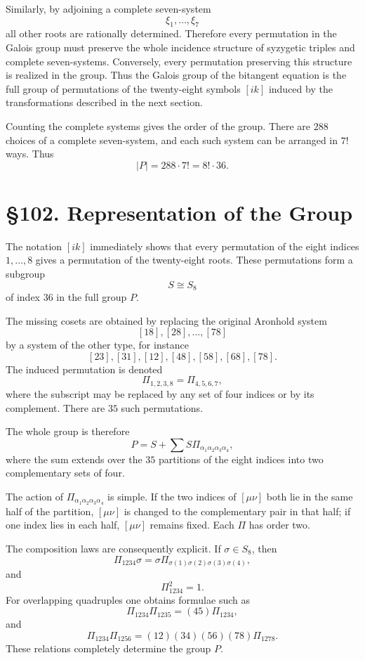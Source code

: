 \documentclass[12pt,a4paper]{article}
\newcommand{\webersection}[2]{\section*{\S #1. #2}\addcontentsline{toc}{section}{\S #1. #2}}
\begin{document}
Similarly, by adjoining a complete seven-system
\[
\xi_1,\ldots,\xi_7
\]
all other roots are rationally determined.  Therefore every permutation in the Galois group must preserve the whole incidence structure of syzygetic triples and complete seven-systems.  Conversely, every permutation preserving this structure is realized in the group.  Thus the Galois group of the bitangent equation is the full group of permutations of the twenty-eight symbols \([ik]\) induced by the transformations described in the next section.

Counting the complete systems gives the order of the group.  There are \(288\) choices of a complete seven-system, and each such system can be arranged in \(7!\) ways.  Thus
\[
|P|=288\cdot7!
   =8!\cdot36.
\]

\webersection{102}{Representation of the Group}

The notation \([ik]\) immediately shows that every permutation of the eight indices \(1,\dots,8\) gives a permutation of the twenty-eight roots.  These permutations form a subgroup
\[
S\cong S_8
\]
of index \(36\) in the full group \(P\).

The missing cosets are obtained by replacing the original Aronhold system
\[
[18],[28],\ldots,[78]
\]
by a system of the other type, for instance
\[
[23],[31],[12],[48],[58],[68],[78].
\]
The induced permutation is denoted
\[
\Pi_{1,2,3,8}=\Pi_{4,5,6,7},
\]
where the subscript may be replaced by any set of four indices or by its complement.  There are \(35\) such permutations.

The whole group is therefore
\[
P=S+\sum S\Pi_{\alpha_1\alpha_2\alpha_3\alpha_4},
\]
where the sum extends over the \(35\) partitions of the eight indices into two complementary sets of four.

The action of \(\Pi_{\alpha_1\alpha_2\alpha_3\alpha_4}\) is simple.  If the two indices of \([\mu\nu]\) both lie in the same half of the partition, \([\mu\nu]\) is changed to the complementary pair in that half; if one index lies in each half, \([\mu\nu]\) remains fixed.  Each \(\Pi\) has order two.

The composition laws are consequently explicit.  If \(\sigma\in S_8\), then
\[
\Pi_{1234}\sigma=\sigma\Pi_{\sigma(1)\sigma(2)\sigma(3)\sigma(4)},
\]
and
\[
\Pi_{1234}^2=1.
\]
For overlapping quadruples one obtains formulae such as
\[
\Pi_{1234}\Pi_{1235}=(45)\Pi_{1234},
\]
and
\[
\Pi_{1234}\Pi_{1256}
=(12)(34)(56)(78)\Pi_{1278}.
\]
These relations completely determine the group \(P\).
\end{document}
